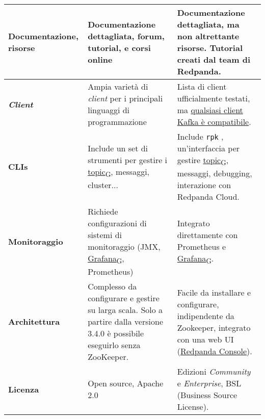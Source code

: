 \begin{longtable}{|>{\centering\arraybackslash}p{}|>{\centering\arraybackslash}p{}|>{\centering\arraybackslash}p{}|}
	\hline
	\textbf{Documentazione, risorse}            & Documentazione dettagliata, forum, tutorial, e corsi online                                                                                                 & Documentazione dettagliata, ma non altrettante risorse. Tutorial creati dal team di Redpanda.                                                                          \\
	\hline
	\textbf{\textit{Client}}                    & Ampia varietà di \textit{client} per i principali linguaggi di programmazione                                                                               & Lista di client ufficialmente testati, ma \href{https://docs.redpanda.com/current/develop/kafka-clients/}{qualsiasi client Kafka è compatibile}.                       \\
	\hline
	\textbf{CLIs}                               & Include un set di strumenti per gestire i \href{https://7last.github.io/docs/rtb/documentazione-interna/glossario\#topic}{topic\textsubscript{G}}, messaggi, cluster...                                                                                       & Include \texttt{rpk} , un'interfaccia per gestire \href{https://7last.github.io/docs/rtb/documentazione-interna/glossario\#topic}{topic\textsubscript{G}}, messaggi, debugging, interazione con Redpanda Cloud.                                                          \\
	\hline
	\textbf{Monitoraggio}                       & Richiede configurazioni di sistemi di monitoraggio (JMX, \href{https://7last.github.io/docs/rtb/documentazione-interna/glossario\#grafana}{Grafana\textsubscript{G}}, Prometheus)                                                                               & Integrato direttamente con Prometheus e \href{https://7last.github.io/docs/rtb/documentazione-interna/glossario\#grafana}{Grafana\textsubscript{G}}.                                                                                                                       \\
	\hline
	\textbf{Architettura}                       & Complesso da configurare e gestire su larga scala. Solo a partire dalla versione 3.4.0 è possibile eseguirlo senza ZooKeeper.                               & Facile da installare e configurare, indipendente da Zookeeper, integrato con una web UI (\href{https://redpanda.com/redpanda-console-kafka-ui}{Redpanda Console}).     \\
	\hline
	\textbf{Licenza}                            & Open source, Apache 2.0                                                                                                                                     & Edizioni \textit{Community} e \textit{Enterprise}, BSL (Business Source License).                                                                                      \\

\end{longtable}
